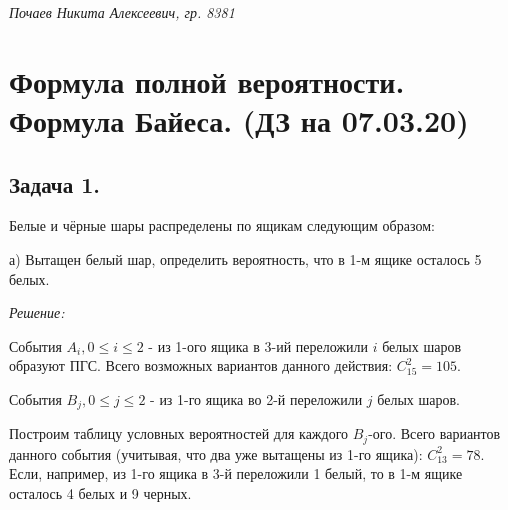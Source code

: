 



\textit{Почаев Никита Алексеевич, гр. 8381}

\section*{Формула полной вероятности. Формула Байеса. (ДЗ на 07.03.20)}

\subsection*{Задача 1.}

Белые и чёрные шары распределены по ящикам следующим образом:

\begin{figure}[H]
\end{figure}

а) Вытащен белый шар, определить вероятность, что в 1-м ящике осталось 5 белых.

\textit{Решение:}

События $A_i, 0 \le i \le 2$ - из 1-ого ящика в 3-ий переложили $i$ белых шаров образуют ПГС. Всего возможных вариантов данного действия: $C_{15}^2 = 105$.

События $B_j, 0 \le j \le 2$ - из 1-го ящика во 2-й переложили $j$ белых шаров.

Построим таблицу условных вероятностей для каждого $B_j$-ого. Всего вариантов данного события (учитывая, что два уже вытащены из 1-го ящика): $C_{13}^2 = 78$. Если, например, из 1-го ящика в 3-й переложили 1 белый, то в 1-м ящике осталось 4 белых и 9 черных.

